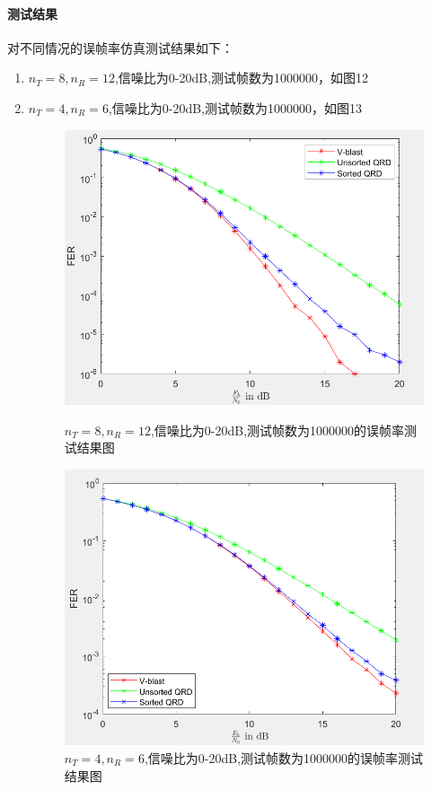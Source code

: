 \documentclass[a4paper,12pt]{article}
\begin{document}
	\paragraph{测试结果}
	对不同情况的误帧率仿真测试结果如下：
	\begin{enumerate}
		\item $n_T=8,n_R=12$,信噪比为0-20dB,测试帧数为1000000，如图12
		\item $n_T=4,n_R=6$,信噪比为0-20dB,测试帧数为1000000，如图13
		\begin{figure}[h]
			\centering
			\begin{minipage}{0.4\textwidth}
				\centering
				\includegraphics[width=\textwidth]{12.png}
				\caption{$n_T=8,n_R=12$,信噪比为0-20dB,测试帧数为1000000的误帧率测试结果图}
			\end{minipage}
			\qquad
			\begin{minipage}{0.4\textwidth}
				\centering
				\includegraphics[width=\textwidth]{13.png}
				\caption{$n_T=4,n_R=6$,信噪比为0-20dB,测试帧数为1000000的误帧率测试结果图}
			\end{minipage}
		\end{figure}
	\end{enumerate}
	\newpage
\end{document}
